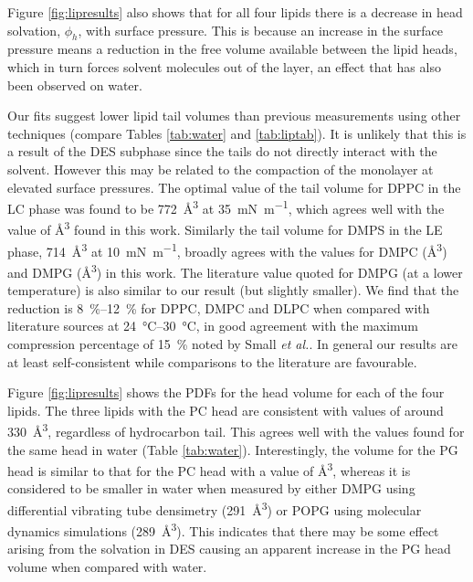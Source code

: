 \documentclass[twocolumn,a4paper]{paper}
\begin{document}
Figure \ref{fig:lipresults} also shows that for all four lipids there is a decrease in head solvation, $\phi_h$, with surface pressure.
This is because an increase in the surface pressure means a reduction in the free volume available between the lipid heads, which in turn forces solvent molecules out of the layer, an effect that has also been observed on water\cite{Bayerl1990}.

Our fits suggest lower lipid tail volumes than previous measurements using other techniques (compare Tables \ref{tab:water} and \ref{tab:liptab}).
It is unlikely that this is a result of the DES subphase since the tails do not directly interact with the solvent.
However this may be related to the compaction of the monolayer at elevated surface pressures.
The optimal value of the tail volume for DPPC in the LC phase\cite{Campbell2018} was found to be \SI{772}{\cubic\angstrom} at \SI{35}{\milli\newton\per\meter}, which agrees well with the value of \si{\cubic\angstrom} found in this work.
Similarly the tail volume for DMPS in the LE phase\cite{Campbell2018}, \SI{714}{\cubic\angstrom} at \SI{10}{\milli\newton\per\meter}, broadly agrees with the values for DMPC (\si{\cubic\angstrom}) and DMPG (\si{\cubic\angstrom}) in this work.
The literature value\cite{Pan2012} quoted for DMPG (at a lower temperature) is also similar to our result (but slightly smaller).
We find that the reduction is \SIrange{8}{12}{\percent} for DPPC, DMPC and DLPC when compared with literature sources at \SIrange{24}{30}{\celsius}, in good agreement with the maximum compression percentage of \SI{15}{\percent} noted by Small \emph{et al.}\cite{Small1984}.
In general our results are at least self-consistent while comparisons to the literature are favourable.

Figure \ref{fig:lipresults} shows the PDFs for the head volume for each of the four lipids.
The three lipids with the PC head are consistent with values of around \SI{330}{\cubic\angstrom}, regardless of hydrocarbon tail.
This agrees well with the values found for the same head in water (Table \ref{tab:water}).
Interestingly, the volume for the PG head is similar to that for the PC head with a value of \si{\cubic\angstrom}, whereas it is considered to be smaller in water when measured by either DMPG using differential vibrating tube densimetry\cite{Pan2012} (\SI{291}{\cubic\angstrom}) or POPG using molecular dynamics simulations\cite{Kucerka2012} (\SI{289}{\cubic\angstrom}).
This indicates that there may be some effect arising from the solvation in DES causing an apparent increase in the PG head volume when compared with water.
\end{document}

